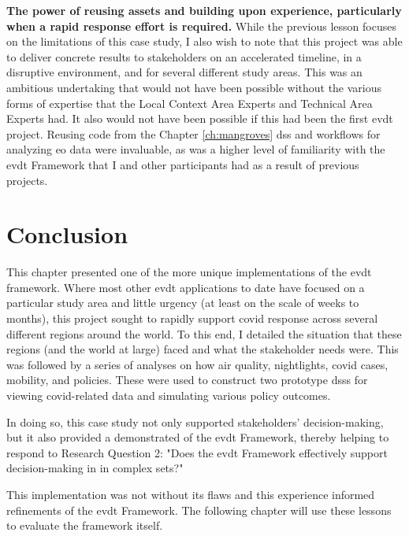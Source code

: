 \textbf{The power of reusing assets and building upon experience, particularly when a rapid response effort is required.} While the previous lesson focuses on the limitations of this case study, I also wish to note that this project was able to deliver concrete results to stakeholders on an accelerated timeline, in a disruptive environment, and for several different study areas. This was an ambitious undertaking that would not have been possible without the various forms of expertise that the Local Context Area Experts and Technical Area Experts had. It also would not have been possible if this had been the first \ac{evdt} project. Reusing code from the Chapter \ref{ch:mangroves} \ac{dss} and workflows for analyzing \ac{eo} data were invaluable, as was a higher level of familiarity with the \ac{evdt} Framework that I and other participants had as a result of previous projects.


\section{Conclusion} \label{sec:vida-concl}

This chapter presented one of the more unique implementations of the \ac{evdt} framework. Where most other \ac{evdt} applications to date have focused on a particular study area and little urgency (at least on the scale of weeks to months), this project sought to rapidly support \ac{covid} response across several different regions around the world. To this end, I detailed the situation that these regions (and the world at large) faced and what the stakeholder needs were. This was followed by a series of analyses on how air quality, nightlights, \ac{covid} cases, mobility, and policies. These were used to construct two prototype \acp{dss} for viewing \ac{covid}-related data and simulating various policy outcomes.

In doing so, this case study not only supported stakeholders' decision-making, but it also provided a demonstrated of the \ac{evdt} Framework, thereby helping to respond to Research Question 2: "Does the \ac{evdt} Framework effectively support decision-making in in complex \ac{sets}?"

This implementation was not without its flaws and this experience informed refinements of the \ac{evdt} Framework. The following chapter will use these lessons to evaluate the framework itself.

